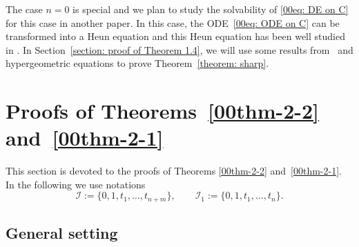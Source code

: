 \documentclass[pdftex]{sigma}
\numberwithin{equation}{section}
\def\bt{\boldsymbol t}
\begin{document}
The case $n=0$ is special and we plan to study the solvability of
\eqref{00eq: DE on C} for this case in another paper. In this case,
the ODE~\eqref{00eq: ODE on C} can be transformed into a Heun equation
and this Heun equation has been well studied in
\cite{Eremenko,Eremenko-Fuchsian}. In Section~\ref{section: proof of
 Theorem 1.4}, we will use some results from~\cite{Eremenko} and
hypergeometric equations to prove Theorem~\ref{theorem: sharp}.

\section{Proofs of Theorems~\ref{00thm-2-2} and~\ref{00thm-2-1}}\label{sec-dimension}

This section is devoted to the proofs of Theorems
\ref{00thm-2-2} and~\ref{00thm-2-1}. In the following we use notations
\[
 \mathcal{I}:=\{0,1,t_1,\dots,t_{n+m}\},\qquad
 \mathcal{I}_1:=\{0,1,t_1,\dots,t_{n}\}.
\]

\subsection{General setting}
\end{document}
